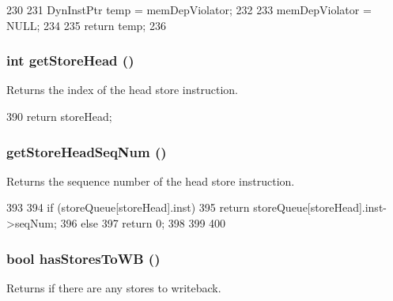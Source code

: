 \begin{DoxyCode}
230 {
231     DynInstPtr temp = memDepViolator;
232 
233     memDepViolator = NULL;
234 
235     return temp;
236 }
\end{DoxyCode}
\hypertarget{classOzoneLSQ_ab9d14b0deb8ab44dc09ac784b162e774}{
\subsubsection[{getStoreHead}]{\setlength{\rightskip}{0pt plus 5cm}int getStoreHead ()}}
\label{classOzoneLSQ_ab9d14b0deb8ab44dc09ac784b162e774}
Returns the index of the head store instruction. 


\begin{DoxyCode}
390 { return storeHead; }
\end{DoxyCode}
\hypertarget{classOzoneLSQ_a1813b58ab7569d6aeefb5d4e235cceda}{
\subsubsection[{getStoreHeadSeqNum}]{ getStoreHeadSeqNum ()}}
\label{classOzoneLSQ_a1813b58ab7569d6aeefb5d4e235cceda}
Returns the sequence number of the head store instruction. 


\begin{DoxyCode}
393     {
394         if (storeQueue[storeHead].inst) {
395             return storeQueue[storeHead].inst->seqNum;
396         } else {
397             return 0;
398         }
399 
400     }
\end{DoxyCode}
\hypertarget{classOzoneLSQ_ad2e4b46255cfb53e85522adeed4e2089}{
\subsubsection[{hasStoresToWB}]{\setlength{\rightskip}{0pt plus 5cm}bool hasStoresToWB ()}}
\label{classOzoneLSQ_ad2e4b46255cfb53e85522adeed4e2089}
Returns if there are any stores to writeback. 


